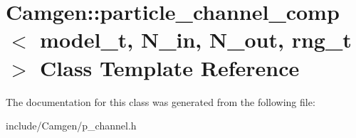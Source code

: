 \hypertarget{a00402}{}\section{Camgen\+:\+:particle\+\_\+channel\+\_\+comp$<$ model\+\_\+t, N\+\_\+in, N\+\_\+out, rng\+\_\+t $>$ Class Template Reference}
\label{a00402}


The documentation for this class was generated from the following file\+:\begin{DoxyCompactItemize}
\item 
include/\+Camgen/p\+\_\+channel.\+h\end{DoxyCompactItemize}
